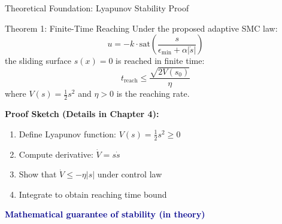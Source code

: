 \documentclass[10pt,aspectratio=169]{beamer}
\newcommand{\highlight}[1]{\textcolor{darkblue}{\textbf{#1}}}
\begin{document}
\begin{frame}{Theoretical Foundation: Lyapunov Stability Proof}
\begin{block}{Theorem 1: Finite-Time Reaching}
Under the proposed adaptive SMC law:
\[
u = -k \cdot \text{sat}\left(\frac{s}{\epsilon_{\min} + \alpha |\dot{s}|}\right)
\]
the sliding surface $s(x) = 0$ is reached in finite time:
\[
t_{\text{reach}} \leq \frac{\sqrt{2V(s_0)}}{\eta}
\]
where $V(s) = \frac{1}{2}s^2$ and $\eta > 0$ is the reaching rate.
\end{block}

\textbf{Proof Sketch (Details in Chapter 4):}
\begin{enumerate}
    \item Define Lyapunov function: $V(s) = \frac{1}{2}s^2 \geq 0$
    \item Compute derivative: $\dot{V} = s\dot{s}$
    \item Show that $\dot{V} \leq -\eta |s|$ under control law
    \item Integrate to obtain reaching time bound
\end{enumerate}

\vspace{0.3cm}
\centering
\highlight{Mathematical guarantee of stability (in theory)}
\end{frame}
\end{document}
